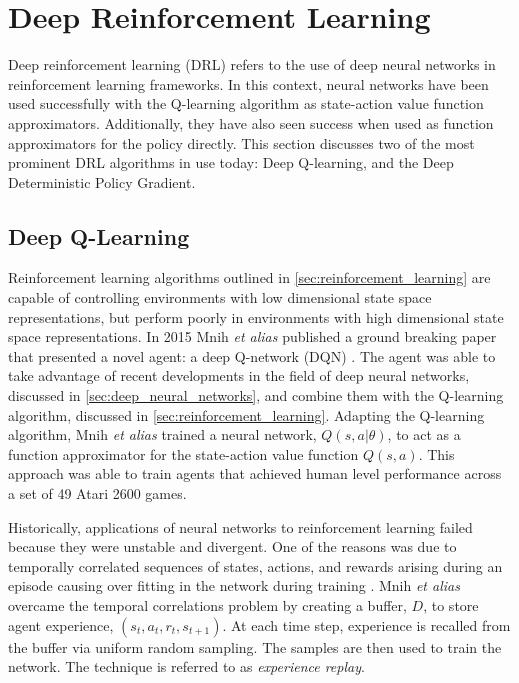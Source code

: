 \section{Deep Reinforcement Learning}\label{sec:deep_reinforcement_learning}
Deep reinforcement learning (DRL) refers to the use of deep neural networks in reinforcement learning frameworks. In this context, neural networks have been used successfully with the Q-learning algorithm as state-action value function approximators. Additionally, they have also seen success when used as function approximators for the policy directly. This section discusses two of the most prominent DRL algorithms in use today: Deep Q-learning, and the Deep Deterministic Policy Gradient.

\subsection{Deep Q-Learning}\label{ssec:deep_q_learning}
Reinforcement learning algorithms outlined in \textsection \ref{sec:reinforcement_learning} are capable of controlling environments with low dimensional state space representations, but perform poorly in environments with high dimensional state space representations. In 2015 Mnih \textit{et alias} published a ground breaking paper that presented a novel agent: a deep Q-network (DQN) \cite{Mnih2015}. The agent was able to take advantage of recent developments in the field of deep neural networks, discussed in \textsection \ref{sec:deep_neural_networks}, and combine them with the Q-learning algorithm, discussed in \textsection \ref{sec:reinforcement_learning}. Adapting the Q-learning algorithm, Mnih \textit{et alias} trained a neural network, $Q(s,a|\theta)$, to act as a function approximator for the state-action value function $Q(s,a)$. This approach was able to train agents that achieved human level performance across a set of 49 Atari 2600 games.

Historically, applications of neural networks to reinforcement learning failed because they were unstable and divergent. One of the reasons was due to temporally correlated sequences of states, actions, and rewards arising during an episode causing over fitting in the network during training \cite{Tsitsiklis1997}. Mnih \textit{et alias} overcame the temporal correlations problem by creating a buffer, $D$, to store agent experience, $(s_t, a_t, r_t, s_{t+1})$. At each time step, experience is recalled from the buffer via uniform random sampling. The samples are then used to train the network. The technique is referred to as \textit{experience replay}.

